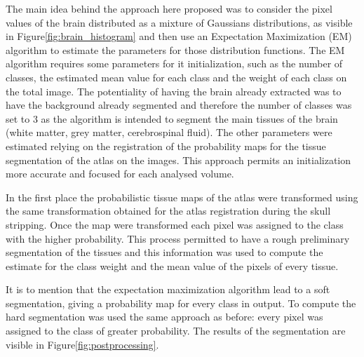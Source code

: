 \documentclass{standalone}
\begin{document}
The main idea behind the approach here proposed was to consider the pixel values of the brain distributed as a mixture of Gaussians distributions, as visible in Figure\ref{fig:brain_histogram} and then use an Expectation Maximization (EM) algorithm to estimate the parameters for those distribution functions. 
The EM algorithm requires some parameters for it initialization, such as the number of classes, the estimated mean value for each class and the weight of each class on the total image.
The potentiality of having the brain already extracted was to have the background already segmented and therefore the number of classes was set to $3$ as the algorithm is intended to segment the main tissues of the brain (white matter, grey matter, cerebrospinal fluid).
The other parameters were estimated relying on the registration of the probability maps for the tissue segmentation of the atlas on the images.
This approach permits an initialization more accurate and focused for each analysed volume.

In the first place the probabilistic tissue maps of the atlas were transformed using the same transformation obtained for the atlas registration during the skull stripping.
Once the map were transformed each pixel was assigned to the class with the higher probability.
This process permitted to have a rough preliminary segmentation of the tissues and this information was used to compute the estimate for the class weight and the mean value of the pixels of every tissue.

It is to mention that the expectation maximization algorithm lead to a soft segmentation, giving a probability map for every class in output. To compute the hard segmentation was used the same approach as before: every pixel was assigned to the class of greater probability.
The results of the segmentation are visible in Figure\ref{fig:postprocessing}.
\end{document}
